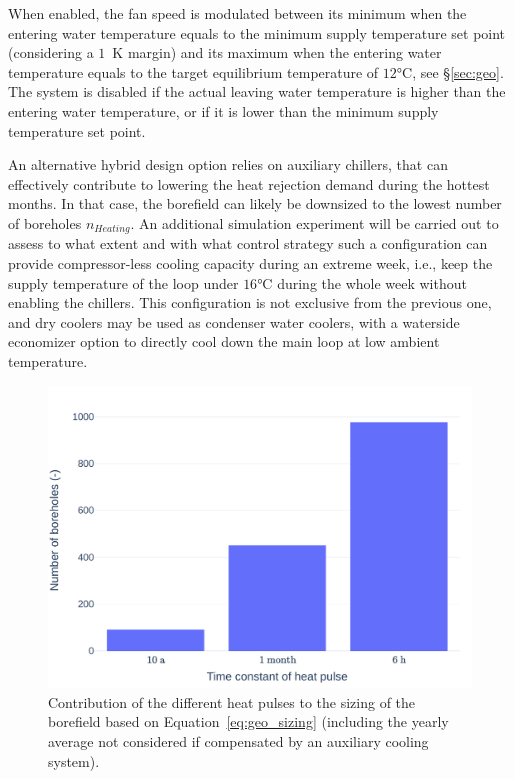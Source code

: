When enabled, the fan speed is modulated between its minimum when the entering water temperature equals to the minimum supply temperature set point (considering a $1$~K margin) and its maximum when the entering water temperature equals to the target equilibrium temperature of $12$°C, see §\ref{sec:geo}.
The system is disabled if the actual leaving water temperature is higher than the entering water temperature, or if it is lower than the minimum supply temperature set point.

An alternative hybrid design option relies on auxiliary chillers, that can effectively contribute to lowering the heat rejection demand during the hottest months. In that case, the borefield can likely be downsized to the lowest number of boreholes $n_{Heating}$.
An additional simulation experiment will be carried out to assess to what extent and with what control strategy such a configuration can provide compressor-less cooling capacity during an extreme week, i.e., keep the supply temperature of the loop under $16$°C during the whole week without enabling the chillers. This configuration is not exclusive from the previous one, and dry coolers may be used as condenser water coolers, with a waterside economizer option to directly cool down the main loop at low ambient temperature.

\begin{figure}[!htbp]
    \centering
    \includegraphics[width=.6\linewidth]{../python_scripts/figures/ContributionL.pdf}
    \caption{Contribution of the different heat pulses to the sizing of the borefield based on  Equation~\ref{eq:geo_sizing} (including the yearly average not considered if compensated by an auxiliary cooling system).}
    \label{fig:contribution_to_L}
\end{figure}

